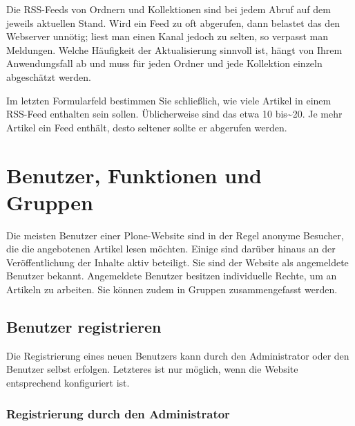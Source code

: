 \documentclass[a4paper,12pt,ngerman]{manual}
\begin{document}
Die RSS-Feeds von Ordnern und Kollektionen sind bei jedem Abruf auf
dem jeweils aktuellen Stand. Wird ein Feed zu oft abgerufen, dann
belastet das den Webserver unnötig; liest man einen Kanal jedoch zu
selten, so verpasst man Meldungen. Welche Häufigkeit der
Aktualisierung sinnvoll ist, hängt von Ihrem Anwendungsfall ab und
muss für jeden Ordner und jede Kollektion einzeln abgeschätzt werden.

Im letzten Formularfeld bestimmen Sie schließlich, wie viele Artikel
in einem RSS-Feed enthalten sein sollen. Üblicherweise sind das etwa
10 bis\textasciitilde{}20. Je mehr Artikel ein Feed enthält, desto seltener sollte er
abgerufen werden.

\resetcurrentobjects
\hypertarget{--doc-benutzer/benutzer}{}

\hypertarget{sec-benutzer}{}\chapter{Benutzer, Funktionen und Gruppen}

Die meisten Benutzer einer Plone-Website sind in der Regel anonyme Besucher,
die die angebotenen Artikel lesen möchten. Einige sind darüber hinaus
an der Veröffentlichung der Inhalte aktiv beteiligt. Sie sind der Website als
angemeldete Benutzer bekannt. Angemeldete Benutzer besitzen individuelle
Rechte, um an Artikeln zu arbeiten. Sie können zudem in Gruppen
zusammengefasst werden.

\resetcurrentobjects
\hypertarget{--doc-benutzer/registrieren}{}

\hypertarget{sec-benutz-registr}{}\section{Benutzer registrieren}

Die Registrierung eines neuen Benutzers kann durch den Administrator oder den
Benutzer selbst erfolgen. Letzteres ist nur möglich, wenn die Website
entsprechend konfiguriert ist.


\hypertarget{sec-registr-durch-den}{}\subsection{Registrierung durch den Administrator}
\end{document}
